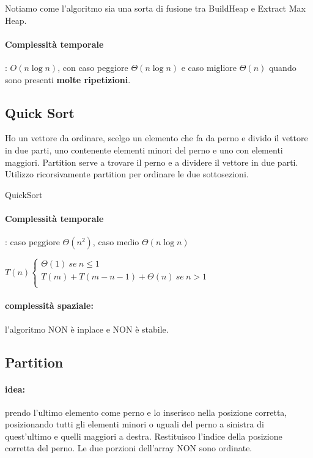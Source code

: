 \documentclass{article}
\begin{document}
Notiamo come l'algoritmo sia una sorta di fusione tra BuildHeap e Extract Max Heap.

\paragraph{Complessità temporale}: $O(n \log n)$, con caso peggiore $\Theta(n \log n)$ e caso migliore $\Theta(n)$ quando sono presenti \textbf{molte ripetizioni}. 

\hypertarget{quicksort}{}\subsection{Quick Sort} %
Ho un vettore da ordinare, scelgo un elemento che fa da perno e divido il vettore in due parti, uno contenente 
elementi minori del perno e uno con elementi maggiori. Partition serve a trovare il perno e a dividere il vettore in due parti.
Utilizzo ricorsivamente partition per ordinare le due sottosezioni.

\begin{algorithm}[H]
\caption{QuickSort}
\end{algorithm}

\paragraph{Complessità temporale}: caso peggiore $\Theta(n^2)$, caso medio $\Theta(n \log n)$

$T(n)\begin{cases}
    \Theta(1) \ se \ n \leq 1\\
    T(m) + T(m-n-1) + \Theta(n) \ se \ n > 1\\
\end{cases}$

\paragraph{complessità spaziale:} l'algoritmo NON è inplace e NON è stabile.

\hypertarget{partition}{\subsection{Partition}} %
\paragraph{idea:} prendo l'ultimo elemento come perno e lo inserisco nella posizione corretta, posizionando tutti 
gli elementi minori o uguali del perno a sinistra di quest'ultimo e quelli maggiori a destra. Restituisco l'indice 
della posizione corretta del perno. Le due porzioni dell'array NON sono ordinate.
\end{document}

